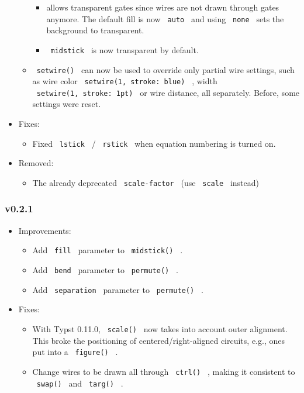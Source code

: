 \begin{itemize}
\begin{itemize}
    \begin{itemize}
    \tightlist
    \item
      allows transparent gates since wires are not drawn through gates
      anymore. The default fill is now \texttt{\ auto\ } and using
      \texttt{\ none\ } sets the background to transparent.
    \item
      \texttt{\ midstick\ } is now transparent by default.
    \end{itemize}
  \item
    \texttt{\ setwire()\ } can now be used to override only partial wire
    settings, such as wire color \texttt{\ setwire(1,\ stroke:\ blue)\ }
    , width \texttt{\ setwire(1,\ stroke:\ 1pt)\ } or wire distance, all
    separately. Before, some settings were reset.
  \end{itemize}
\item
  Fixes:

  \begin{itemize}
  \tightlist
  \item
    Fixed \texttt{\ lstick\ } / \texttt{\ rstick\ } when equation
    numbering is turned on.
  \end{itemize}
\item
  Removed:

  \begin{itemize}
  \tightlist
  \item
    The already deprecated \texttt{\ scale-factor\ } (use
    \texttt{\ scale\ } instead)
  \end{itemize}
\end{itemize}

\subsubsection{v0.2.1}\label{v0.2.1}

\begin{itemize}
\tightlist
\item
  Improvements:

  \begin{itemize}
  \tightlist
  \item
    Add \texttt{\ fill\ } parameter to \texttt{\ midstick()\ } .
  \item
    Add \texttt{\ bend\ } parameter to \texttt{\ permute()\ } .
  \item
    Add \texttt{\ separation\ } parameter to \texttt{\ permute()\ } .
  \end{itemize}
\item
  Fixes:

  \begin{itemize}
  \tightlist
  \item
    With Typst 0.11.0, \texttt{\ scale()\ } now takes into account outer
    alignment. This broke the positioning of centered/right-aligned
    circuits, e.g., ones put into a \texttt{\ figure()\ } .
  \item
    Change wires to be drawn all through \texttt{\ ctrl()\ } , making it
    consistent to \texttt{\ swap()\ } and \texttt{\ targ()\ } .
  \end{itemize}
\end{itemize}

